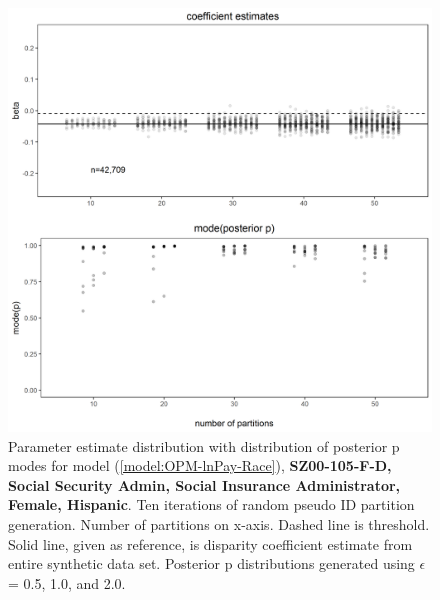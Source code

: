 \documentclass[10pt, letterpaper]{article}
\begin{document}
\begin{spacing}{1.0}
\clearpage

\begin{figure}[]
    \centering
    \includegraphics[width=6in]{images/RacePayDifferentialBetaWithPosteriorDistribution-SZ00-105-F-D.png}
    \caption{Parameter estimate distribution with distribution of posterior p modes for model (\ref{model:OPM-lnPay-Race}), \textbf{SZ00-105-F-D, Social Security Admin, Social Insurance Administrator, Female, Hispanic}.  Ten iterations of random pseudo ID partition generation.  Number of partitions on x-axis.  Dashed line is threshold.  Solid line, given as reference, is disparity coefficient estimate from entire synthetic data set.  Posterior p distributions generated using $\epsilon$ = 0.5, 1.0, and 2.0.}
    \label{figure:RacePayDifferentialBetaWithPosteriorDistribution-SZ00-105-F-D}
\end{figure}

\clearpage


\end{spacing}
\end{document}
